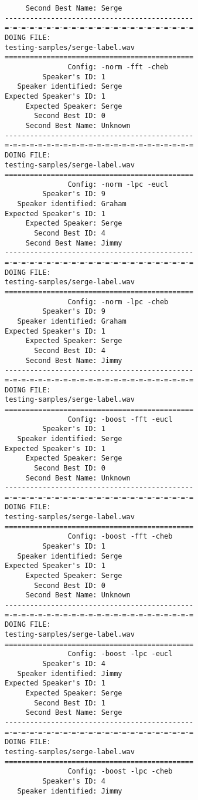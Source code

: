\begin{verbatim}
     Second Best Name: Serge
---------------------------------------------
=-=-=-=-=-=-=-=-=-=-=-=-=-=-=-=-=-=-=-=-=-=-=
DOING FILE:
testing-samples/serge-label.wav
=============================================
               Config: -norm -fft -cheb
         Speaker's ID: 1
   Speaker identified: Serge
Expected Speaker's ID: 1
     Expected Speaker: Serge
       Second Best ID: 0
     Second Best Name: Unknown
---------------------------------------------
=-=-=-=-=-=-=-=-=-=-=-=-=-=-=-=-=-=-=-=-=-=-=
DOING FILE:
testing-samples/serge-label.wav
=============================================
               Config: -norm -lpc -eucl
         Speaker's ID: 9
   Speaker identified: Graham
Expected Speaker's ID: 1
     Expected Speaker: Serge
       Second Best ID: 4
     Second Best Name: Jimmy
---------------------------------------------
=-=-=-=-=-=-=-=-=-=-=-=-=-=-=-=-=-=-=-=-=-=-=
DOING FILE:
testing-samples/serge-label.wav
=============================================
               Config: -norm -lpc -cheb
         Speaker's ID: 9
   Speaker identified: Graham
Expected Speaker's ID: 1
     Expected Speaker: Serge
       Second Best ID: 4
     Second Best Name: Jimmy
---------------------------------------------
=-=-=-=-=-=-=-=-=-=-=-=-=-=-=-=-=-=-=-=-=-=-=
DOING FILE:
testing-samples/serge-label.wav
=============================================
               Config: -boost -fft -eucl
         Speaker's ID: 1
   Speaker identified: Serge
Expected Speaker's ID: 1
     Expected Speaker: Serge
       Second Best ID: 0
     Second Best Name: Unknown
---------------------------------------------
=-=-=-=-=-=-=-=-=-=-=-=-=-=-=-=-=-=-=-=-=-=-=
DOING FILE:
testing-samples/serge-label.wav
=============================================
               Config: -boost -fft -cheb
         Speaker's ID: 1
   Speaker identified: Serge
Expected Speaker's ID: 1
     Expected Speaker: Serge
       Second Best ID: 0
     Second Best Name: Unknown
---------------------------------------------
=-=-=-=-=-=-=-=-=-=-=-=-=-=-=-=-=-=-=-=-=-=-=
DOING FILE:
testing-samples/serge-label.wav
=============================================
               Config: -boost -lpc -eucl
         Speaker's ID: 4
   Speaker identified: Jimmy
Expected Speaker's ID: 1
     Expected Speaker: Serge
       Second Best ID: 1
     Second Best Name: Serge
---------------------------------------------
=-=-=-=-=-=-=-=-=-=-=-=-=-=-=-=-=-=-=-=-=-=-=
DOING FILE:
testing-samples/serge-label.wav
=============================================
               Config: -boost -lpc -cheb
         Speaker's ID: 4
   Speaker identified: Jimmy

\end{verbatim}
